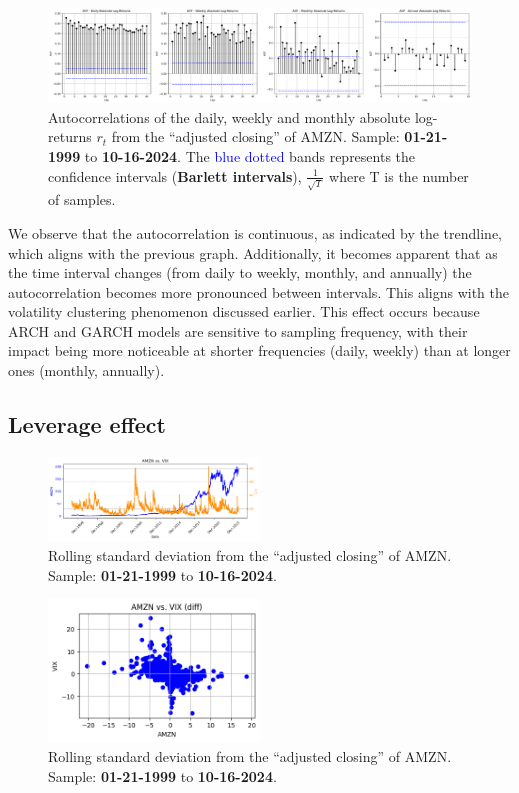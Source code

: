 \documentclass{article}
\begin{document}
\begin{figure}[H]
    \centering
    \includegraphics[width=1\textwidth]{Img/Fact7_AbsoluteLogReturns.pdf}
    \caption{Autocorrelations of the daily, weekly and monthly absolute log-returns $r_t$ from the “adjusted closing” of AMZN. Sample: \textbf{01-21-1999} to \textbf{10-16-2024}.
    The \textcolor{blue}{blue dotted} bands represents the confidence intervals (\textbf{Barlett intervals}), $\frac{1}{\sqrt{T}}$ where T is the number of samples.}
    \label{fig:atocorrelation_abs_logreturns}
\end{figure}

\noindent We observe that the autocorrelation is continuous, as indicated by the trendline, 
which aligns with the previous graph. 
Additionally, it becomes apparent that as the time interval changes (from daily to weekly, monthly, and annually) 
the autocorrelation becomes more pronounced between intervals. 
This aligns with the volatility clustering phenomenon discussed earlier. 
This effect occurs because ARCH and GARCH models are sensitive to sampling frequency, 
with their impact being more noticeable at shorter frequencies (daily, weekly) than at longer ones (monthly, annually).

\subsection{Leverage effect}

\begin{figure}[H]
    \centering
    \includegraphics[width=0.5\textwidth]{Img/Fact8.pdf}
    \caption{Rolling standard deviation from the “adjusted closing” of AMZN. Sample: \textbf{01-21-1999} to \textbf{10-16-2024}.}
    \label{fig:Rolling_std_dev_2}
\end{figure}

\begin{figure}[H]
    \centering
    \includegraphics[width=0.5\textwidth]{Img/Fact8_2.pdf}
    \caption{Rolling standard deviation from the “adjusted closing” of AMZN. Sample: \textbf{01-21-1999} to \textbf{10-16-2024}.}
    \label{fig:Rolling_std_dev_3}
\end{figure}
\end{document}
